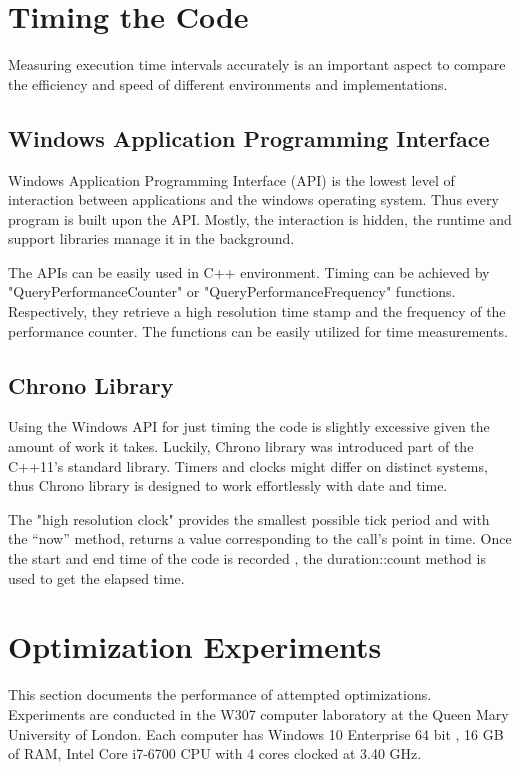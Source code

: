 \documentclass[12pt, oneside]{book}
\theoremstyle{plain}
\theoremstyle{definition}
\begin{document}
\section{Timing the Code}
Measuring execution time intervals accurately is an important aspect to compare the efficiency and speed of different environments and implementations.


\subsection{Windows Application Programming Interface}
Windows Application Programming Interface (API) is the lowest level of interaction between applications and the windows operating system. Thus every program is built upon  the API. Mostly, the interaction is hidden, the runtime and support libraries manage it in the background. \cite{windows}

The APIs can be easily used in C++ environment. Timing can be achieved by "QueryPerformanceCounter" or "QueryPerformanceFrequency"  functions. Respectively, they retrieve a high resolution time stamp and the frequency of the performance counter.  The functions can be easily utilized for time measurements.

\subsection{Chrono Library}
Using the Windows API for just timing the code is slightly excessive given the amount of work it takes. Luckily, Chrono library was introduced part of the C++11’s standard library.  Timers and clocks might differ on distinct systems, thus Chrono library is designed to work effortlessly with date and time.

The "high resolution clock" provides the smallest possible tick period and with the “now” method, returns a value corresponding to the call’s point in time.  Once the start and end time of the code is recorded ,  the duration::count method is used to get the elapsed time.


\section{Optimization Experiments}

This section documents the performance of attempted optimizations. Experiments  are  conducted  in  the  W307 computer laboratory at  the  Queen Mary University of London.  Each computer has Windows 10 Enterprise 64 bit , 16 GB of RAM, Intel Core i7-6700 CPU with 4 cores clocked at 3.40 GHz. 
\end{document}
